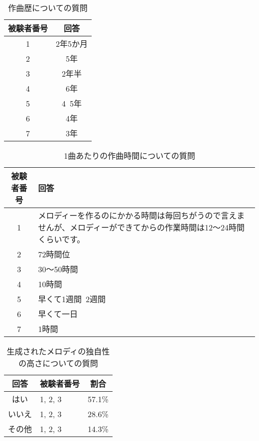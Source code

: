 \begin{table}[htbp]
  \begin{center}
    \caption{作曲歴についての質問}
    \begin{tabular}{cc}
      \hline
      被験者番号 & 回答 \\ \hline \hline
      1 & 2年5か月\rule[-3mm]{0mm}{8mm} \\ \hline
      2 & 5年\rule[-3mm]{0mm}{8mm} \\ \hline
      3 & 2年半\rule[-3mm]{0mm}{8mm} \\ \hline
      4 & 6年\rule[-3mm]{0mm}{8mm} \\ \hline
      5 & 4~5年\rule[-3mm]{0mm}{8mm} \\ \hline
      6 & 4年\rule[-3mm]{0mm}{8mm} \\ \hline
      7 & 3年\rule[-3mm]{0mm}{8mm} \\ \hline
    \end{tabular}
  \end{center}
\end{table}

\begin{table}[htbp]
  \begin{center}
    \caption{1曲あたりの作曲時間についての質問}
    \begin{tabular}{cp{30em}}
      \hline
      被験者番号 & 回答\rule[-3mm]{0mm}{8mm} \\ \hline \hline
      1 & メロディーを作るのにかかる時間は毎回ちがうので言えませんが、メロディーができてからの作業時間は12～24時間くらいです。\rule[-3mm]{0mm}{8mm} \\ \hline
      2 & 72時間位\rule[-3mm]{0mm}{8mm} \\ \hline
      3 & 30〜50時間\rule[-3mm]{0mm}{8mm} \\ \hline
      4 & 10時間\rule[-3mm]{0mm}{8mm} \\ \hline
      5 & 早くて1週間~2週間\rule[-3mm]{0mm}{8mm} \\ \hline
      6 & 早くて一日\rule[-3mm]{0mm}{8mm} \\ \hline
      7 & 1時間\rule[-3mm]{0mm}{8mm} \\ \hline
    \end{tabular}
  \end{center}
\end{table}

\begin{table}[htbp]
  \begin{center}
    \caption{生成されたメロディの独自性の高さについての質問}
    \begin{tabular}{|c|p{10em}|c|}
      \hline
      回答 & 被験者番号 & 割合\rule[-3mm]{0mm}{8mm} \\ \hline \hline
      はい & 1, 2, 3 & 57.1\% \rule[-3mm]{0mm}{8mm} \\ \hline
      いいえ & 1, 2, 3 & 28.6\% \rule[-3mm]{0mm}{8mm} \\ \hline
      その他 & 1, 2, 3 & 14.3\% \rule[-3mm]{0mm}{8mm} \\ \hline
    \end{tabular}
  \end{center}
\end{table}